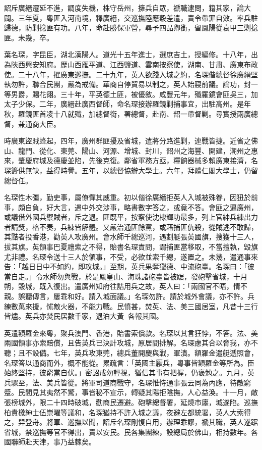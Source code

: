 \begin{pinyinscope}
詔斥廣縉遷延不進，調度失機，株守岳州，擁兵自眾，褫職逮問，籍其家，論大闢。三年夏，粵匪入河南境，釋廣縉，交巡撫陸應穀差遣，責令帶罪自效。率兵駐歸德，防剿捻匪有功。八年，命赴勝保軍營，尋予四品卿銜，留鳳陽從袁甲三剿捻匪。未幾，卒。

葉名琛，字昆臣，湖北漢陽人。道光十五年進士，選庶吉土，授編修。十八年，出為陜西興安知府。歷山西雁平道、江西鹽道、雲南按察使，湖南、甘肅、廣東布政使。二十八年，擢廣東巡撫。二十九年，英人欲踐入城之約，名琛偕總督徐廣縉堅執勿許，聯合民團，嚴為戒備。華商自停貿易以制之，英人始寢前議。論功，封一等男爵，賜花翎。三十年，平英德土匪，被優敘。咸豐元年，殲羅鏡會匪吳三，加太子少保。二年，廣縉赴廣西督師，命名琛接辦羅鏡剿捕事宜，出駐高州。是年秋，羅鏡匪首凌十八就殲，加總督銜，署總督，赴南、韶一帶督剿。尋實授兩廣總督，兼通商大臣。

時廣東盜賊蜂起，四年，廣州群匪擾及省城，遣將分路進剿，連戰皆捷。近省之佛山、龍門、從化、東莞、陽山、河源、增城、封川，韶州之海豐、開建，潮州之惠來，肇慶府城及德慶並陷，先後克復。鄰省軍務方亟，糧餉器械多賴廣東接濟，名琛籌供無缺，益得時譽。五年，以總督協辦大學士。六年，拜體仁閣大學士，仍留總督任。

名琛性木彊，勤吏事，屬僚憚其威重。初以偕徐廣縉拒英人入城被殊眷，因狃於前事，頗自負，好大言，遇中外交涉事，略書數字答之，或竟不答。會匪之逼廣州，或議借外國兵禦賊者，斥之退。匪既平，按察使沈棣輝功最多，列上官紳兵練出力者請獎，格不奏，兵練皆解體。又嚴治通匪餘黨，或藉捕匪仇殺，從賊逃不敢歸，其黠者投香港，勸英人攻廣州。會水師千總巡河，遇劃艇張英國旗，搜獲十三人，拔其旗。英領事巴夏禮索之不得，貽書名琛責問，謂捕匪當移取，不當擅執，毀旗尤非禮。名琛令送十三人於領事，不受，必欲並索千總，遂置之。未幾，遣通事來告：「越日日中不如約，即攻城。」至期，英兵果奪獵德、中流砲臺。名琛曰：「彼當自走。」令水師勿與戰，於是鳳皇山、海珠諸砲臺皆被踞，發砲擊省城，十月朔，毀城，既入復出。遣廣州知府往詰用兵之故，英人曰：「兩國官不晤，情不親。誤聽傳言，屢乖和好。請入城面議。」名琛勿許。請於城外會議，亦不許。兵練數萬來援，怵敵火器，不能力戰。民憤甚，焚英、法、美三國居室，凡昔十三行皆燼。英兵亦焚民居數千家，退泊大黃，各報其國。

英遣額羅金來粵，聚兵澳門、香港，貽書索償款。名琛以其言狂悖，不答。法、美兩國領事亦索賠償，且告英兵已決計攻城，原居間排解。名琛慮其合以脅我，亦不聽；且不設備。七年，英兵攻東莞，總兵董開慶與戰，軍潰。額羅金遣艇遞照會，名琛答以通商而外，概不能從。累疏言：「英國主厭兵，粵事皆額羅金等所為。臣始終堅持，彼窮當自伏。」密詔戒勿輕視，猶信其事有把握，仍褒勉之。九月，英兵驟至，法、美兵皆從。將軍司道商戰守，名琛惟恃通事張云同為內應，待敵窮蹙。民間見其夷然不驚，事皆秘不宣示，轉疑其陽拒陰撫，人心益渙。十一月，敵張榜城外，限二十四時破城，勸商民遷避。砲擊總督署，延燒市廛，城遂陷。巡撫柏貴檄紳士伍崇曜等議和，名琛猶持不許入城之議，夜避左都統署，英人大索得之，舁登舟。將軍、巡撫以聞，詔斥名琛剛愎自用，辦理乖謬，褫其職，英人遂踞省城，禁巡撫等官不得出，責以安民。民各集團練，設總局於佛山，相持數年。各國聯師赴天津，事乃益棘矣。


\end{pinyinscope}
